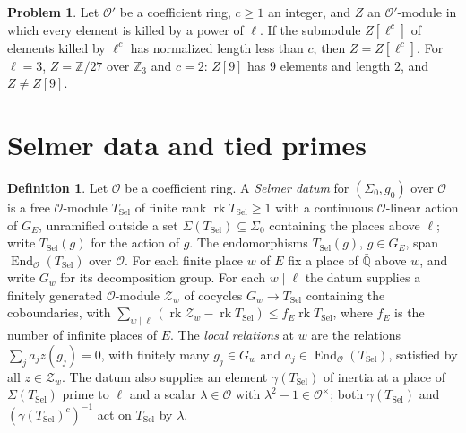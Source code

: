 \documentclass[reqno]{amsart}
\theoremstyle{definition}
\newtheorem{problem}{Problem}[section]
\newtheorem{definition}{Definition}[section]
\theoremstyle{plain}
\newcommand{\Z}{\mathbb{Z}}
\newcommand{\Q}{\mathbb{Q}}
\newcommand{\rk}{\operatorname{rk}}
\newcommand{\Oc}{\mathcal{O}}
\newcommand{\TS}{T_{\mathrm{Sel}}}
\begin{document}
\begin{problem}\label{pr:cutoff}
Let \(\Oc'\) be a coefficient ring, \(c \ge 1\) an integer, and \(Z\) an \(\Oc'\)-module in which every element is killed by a power of \(\ell\).  If the submodule \(Z[\ell^c]\) of elements killed by \(\ell^c\) has normalized length less than \(c\), then \(Z = Z[\ell^c]\).  For \(\ell = 3\), \(Z = \Z/27\) over \(\Z_3\) and \(c = 2\): \(Z[9]\) has \(9\) elements and length \(2\), and \(Z \ne Z[9]\).
\end{problem}

\section{Selmer data and tied primes}\label{sec:data}

\begin{definition}\label{def:selmer-datum}
Let \(\Oc\) be a coefficient ring.  A \emph{Selmer datum} for \((\Sigma_0, g_0)\) over \(\Oc\) is a free \(\Oc\)-module \(\TS\) of finite rank \(\rk\TS \ge 1\) with a continuous \(\Oc\)-linear action of \(G_E\), unramified outside a set \(\Sigma(\TS) \subseteq \Sigma_0\) containing the places above \(\ell\); write \(\TS(g)\) for the action of \(g\).  The endomorphisms \(\TS(g)\), \(g \in G_E\), span \(\operatorname{End}_{\Oc}(\TS)\) over \(\Oc\).  For each finite place \(w\) of \(E\) fix a place of \(\bar{\Q}\) above \(w\), and write \(G_w\) for its decomposition group.  For each \(w \mid \ell\) the datum supplies a finitely generated \(\Oc\)-module \(\mathcal Z_w\) of cocycles \(G_w \to \TS\) containing the coboundaries, with \(\sum_{w \mid \ell}(\rk \mathcal Z_w - \rk\TS) \le f_E \rk\TS\), where \(f_E\) is the number of infinite places of \(E\).  The \emph{local relations} at \(w\) are the relations \(\sum_j a_j z(g_j) = 0\), with finitely many \(g_j \in G_w\) and \(a_j \in \operatorname{End}_{\Oc}(\TS)\), satisfied by all \(z \in \mathcal Z_w\).  The datum also supplies an element \(\gamma(\TS)\) of inertia at a place of \(\Sigma(\TS)\) prime to \(\ell\) and a scalar \(\lambda \in \Oc\) with \(\lambda^2 - 1 \in \Oc^\times\); both \(\gamma(\TS)\) and \((\gamma(\TS)^c)^{-1}\) act on \(\TS\) by \(\lambda\).


\end{definition}
\end{document}
